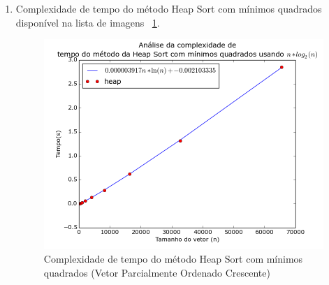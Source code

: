 \documentclass[12pt,a4paper,twoside]{report}
\begin{document}
\begin{enumerate}
\begin{enumerate}
								
							
								
								\item Complexidade de tempo do método Heap Sort com mínimos quadrados disponível na lista de imagens  ~\ref{fig:HeapPlot3POC}.
								\begin{figure}[!h]
									\centering
									\includegraphics[scale=0.6]{../imagens/Heap/heap_plot_3_parcialmente_ordenado_crescente.png}
									\caption{Complexidade de tempo do método Heap Sort com mínimos quadrados (Vetor Parcialmente Ordenado Crescente) \label{fig:HeapPlot3POC}}
								\end{figure}
							
							\end{enumerate}
			

\end{enumerate}
\end{document}
